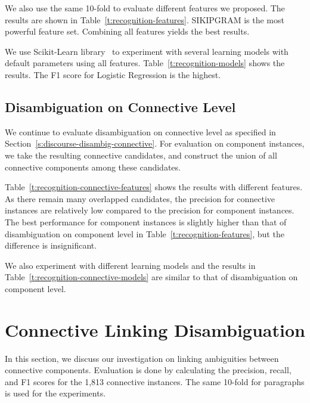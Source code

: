 We also use the same 10-fold to evaluate different features we proposed.
The results are shown in Table~\ref{t:recognition-features}. SIKIPGRAM
is the most powerful feature set. Combining all features yields the best results.



We use Scikit-Learn library~\citep{scikit-learn} to experiment with
several learning models with default parameters using all features.
Table~\ref{t:recognition-models} shows the results. The F1 score for Logistic
Regression is the highest.




\subsection{Disambiguation on Connective Level}

We continue to  evaluate disambiguation on connective level as specified in
Section~\ref{s:discourse-disambig-connective}. For evaluation on component instances,
we take the resulting connective candidates, and construct 
the union of all connective components among these candidates.

Table~\ref{t:recognition-connective-features} shows the results with different features.
As there remain many overlapped candidates, the precision for connective instances
are relatively low compared to the precision for component instances. The best performance
for component instances is slightly higher than that of disambiguation on component level in
Table~\ref{t:recognition-features},
but the difference is insignificant.



We also experiment with different learning models and the results
in Table~\ref{t:recognition-connective-models} are similar to that of disambiguation on
component level.



\section{Connective Linking Disambiguation}
\label{s:linking-exp}

In this section, we discuss our investigation on linking ambiguities between connective
components. Evaluation is done by calculating the precision, recall, and F1 scores for the
1,813 connective instances.
The same 10-fold for paragraphs is used for the experiments.

